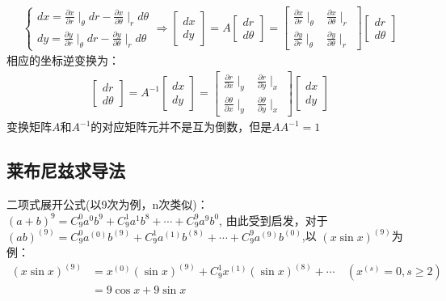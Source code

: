 \documentclass[UTF8]{article}
\begin{document}
\begin{align*}
    \begin{cases}
        dx = \frac{\partial x}{\partial r}\mid _\theta  dr-\frac{\partial x}{\partial \theta }\mid _r   d\theta \\
        dy =\frac{\partial y}{\partial r}\mid _\theta  dr-\frac{\partial y}{\partial \theta }\mid _r   d\theta
    \end{cases}
    \Rightarrow
    \begin{bmatrix}
        dx \\dy
    \end{bmatrix}=A
    \begin{bmatrix}
        dr \\d\theta
    \end{bmatrix}
    =\begin{bmatrix}
         \frac{\partial x}{\partial r} \mid_\theta & \frac{\partial x}{\partial \theta }\mid _r \\
         \frac{\partial y}{\partial r} \mid_\theta & \frac{\partial y}{\partial \theta }\mid _r
     \end{bmatrix}
    \begin{bmatrix}
        dr \\d\theta
    \end{bmatrix}
\end{align*}
相应的坐标逆变换为：
\begin{align*}
    \begin{bmatrix}
        dr \\d\theta
    \end{bmatrix}=A^{-1}
    \begin{bmatrix}
        dx \\dy
    \end{bmatrix}
    =\begin{bmatrix}
         \frac{\partial r}{\partial x} \mid_y       & \frac{\partial r}{\partial y }\mid _x       \\
         \frac{\partial \theta }{\partial x} \mid_y & \frac{\partial \theta }{\partial y }\mid _x
     \end{bmatrix}
    \begin{bmatrix}
        dx \\dy
    \end{bmatrix}
\end{align*}
变换矩阵$A$和$A^{-1}$的对应矩阵元并不是互为倒数，但是$AA^{-1}=1$
\subsection{莱布尼兹求导法}
二项式展开公式(以9次为例，n次类似)：$(a+b)^9=C_9^0 a^0b^9+C_9^1a^1b^8+\cdots+C_9^9 a^9b^0$,
由此受到启发，对于$(ab)^{(9)}=C_9^0 a^{(0)}b^{(9)}+C_9^1a^{(1)}b^{(8)}+\cdots+C_9^9 a^{(9)}b^{(0)}$,以
$(x\sin x)^{(9)}$为例：
\begin{align*}
    (x\sin x)^{(9)} &=x^{(0)}(\sin x)^{(9)}+C_9^1 x^{(1)}(\sin x)^{(8)}+\cdots\quad( x^{(s)}=0,s\geq 2)\\
    &= 9\cos x+9\sin x
\end{align*}
\end{document}
